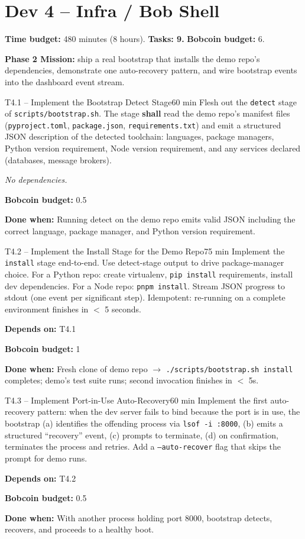 \documentclass[11pt,letterpaper]{article}
\newcommand{\acceptance}[1]{\par\smallskip\textcolor{ibmgreen}{\textbf{Done when:}} #1}
\newcommand{\depends}[1]{\par\smallskip\textcolor{ibmorange}{\textbf{Depends on:}} #1}
\newcommand{\nodep}{\par\smallskip\textcolor{ibmgray}{\textit{No dependencies.}}}
\newcommand{\bobcost}[1]{\par\smallskip\textcolor{ibmaccent}{\textbf{Bobcoin budget:}} #1}
\newcommand{\shall}{\textbf{shall}}
\begin{document}
\section{Dev 4 -- Infra / Bob Shell}

\textbf{Time budget:} 480 minutes (8 hours). \textbf{Tasks: 9.} \textbf{Bobcoin budget:} 6.

\textbf{Phase 2 Mission:} ship a real bootstrap that installs the demo repo's dependencies, demonstrate one auto-recovery pattern, and wire bootstrap events into the dashboard event stream.

\begin{task}{T4.1 -- Implement the Bootstrap Detect Stage}{60 min}
Flesh out the \texttt{detect} stage of \texttt{scripts/bootstrap.sh}. The stage \shall{} read the demo repo's manifest files (\texttt{pyproject.toml}, \texttt{package.json}, \texttt{requirements.txt}) and emit a structured JSON description of the detected toolchain: languages, package managers, Python version requirement, Node version requirement, and any services declared (databases, message brokers).
\nodep
\bobcost{0.5}
\acceptance{Running detect on the demo repo emits valid JSON including the correct language, package manager, and Python version requirement.}
\end{task}

\begin{task}{T4.2 -- Implement the Install Stage for the Demo Repo}{75 min}
Implement the \texttt{install} stage end-to-end. Use detect-stage output to drive package-manager choice. For a Python repo: create virtualenv, \texttt{pip install} requirements, install dev dependencies. For a Node repo: \texttt{pnpm install}. Stream JSON progress to stdout (one event per significant step). Idempotent: re-running on a complete environment finishes in $<$ 5 seconds.
\depends{T4.1}
\bobcost{1}
\acceptance{Fresh clone of demo repo $\rightarrow$ \texttt{./scripts/bootstrap.sh install} completes; demo's test suite runs; second invocation finishes in $<$ 5s.}
\end{task}

\begin{task}{T4.3 -- Implement Port-in-Use Auto-Recovery}{60 min}
Implement the first auto-recovery pattern: when the dev server fails to bind because the port is in use, the bootstrap (a) identifies the offending process via \texttt{lsof -i :8000}, (b) emits a structured ``recovery'' event, (c) prompts to terminate, (d) on confirmation, terminates the process and retries. Add a \texttt{--auto-recover} flag that skips the prompt for demo runs.
\depends{T4.2}
\bobcost{0.5}
\acceptance{With another process holding port 8000, bootstrap detects, recovers, and proceeds to a healthy boot.}
\end{task}
\end{document}
